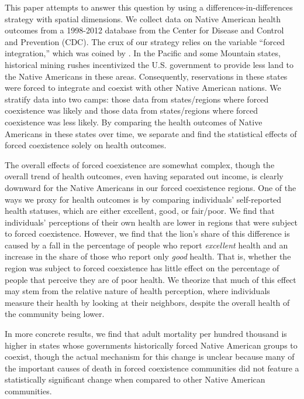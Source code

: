 \documentclass[12pt]{article}
\begin{document}
This paper attempts to answer this question by using a differences-in-differences strategy with spatial dimensions. 
We collect data on Native American health outcomes from a 1998-2012 database from the Center for Disease and Control and Prevention (CDC).
The crux of our strategy relies on the variable ``forced integration,'' which was coined by \cite{dippel2010forced}.
In the Pacific and some Mountain states, historical mining rushes incentivized the U.S. government to provide less land to the Native Americans in these areas. 
Consequently, reservations in these states were forced to integrate and coexist with other Native American nations. 
We stratify data into two camps: those data from states/regions where forced coexistence was likely and those data from states/regions where forced coexistence was less likely.
By comparing the health outcomes of Native Americans in these states over time, we separate and find the statistical effects of forced coexistence solely on health outcomes.

The overall effects of forced coexistence are somewhat complex, though the overall trend of health outcomes, even having separated out income, is clearly downward for the Native Americans in our forced coexistence regions. 
One of the ways we proxy for health outcomes is by comparing individuals' self-reported health statuses, which are either excellent, good, or fair/poor.
We find that individuals' perceptions of their own health are lower in regions that were subject to forced coexistence. 
However, we find that the lion's share of this difference is caused by a fall in the percentage of people who report \emph{excellent} health and an increase in the share of those who report only \emph{good} health.
That is, whether the region was subject to forced coexistence has little effect on the percentage of people that perceive they are of poor health. 
We theorize that much of this effect may stem from the relative nature of health perception, where individuals measure their health by looking at their neighbors, despite the overall health of the community being lower.

In more concrete results, we find that adult mortality per hundred thousand is higher in states whose governments historically forced Native American groups to coexist, though the actual mechanism for this change is unclear because many of the important causes of death in forced coexistence communities did not feature a statistically significant change when compared to other Native American communities.
\end{document}
